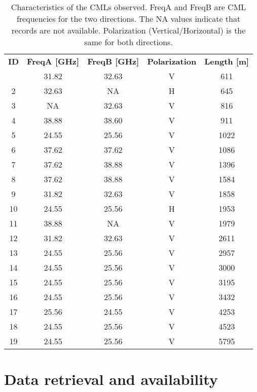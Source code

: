 \documentclass{ctuthesis}\usepackage[]{graphicx}\usepackage[]{color}
\begin{document}
\begin{table}[p]
\small
\begin{ctucolortab}
\centering
\begin{tabular}{ c | c  c  c  c }
\bfseries ID    &       \textbf{FreqA [GHz]}   &  \bfseries FreqB [GHz]  &  \bfseries  Polarization  & \bfseries Length [m]   \\ \Midrule
        1  &	31.82 &	32.63 &	V  &	611     \\
        2  &	32.63 &	NA    &	H  &	645     \\
        3  &	NA    &	32.63 &	V  &	816     \\      
        4  &	38.88 &	38.60 &	V  &	911     \\
        5  &	24.55 &	25.56 &	V  &	1022    \\
        6  &	37.62 &	37.62 &	V  &	1086    \\         
        7  &	37.62 &	38.88 &	V  &	1396    \\
        8  &	37.62 &	38.88 &	V  &	1584    \\
        9  &	31.82 &	32.63 &	V  &	1858    \\
        10  &	24.55 &	25.56 &	H  &	1953    \\
        11  &	38.88 &	NA    &	V  &	1979    \\
        12  &	31.82 &	32.63 &	V  &	2611    \\
        13  &	24.55 &	25.56 &	V  &	2957    \\
        14  &	24.55 &	25.56 &	V  &	3000    \\
        15  &	24.55 &	25.56 &	V  &	3195    \\
        16  &	24.55 &	25.56 &	V  &	3432    \\
        17  &	25.56 &	24.55 &	V  &	4253    \\
        18  &	24.55 &	25.56 &	V  &	4523    \\
        19  &	24.55 &	25.56 &	V  &	5795
\end{tabular}
\caption{Characteristics of the CMLs observed. FreqA and FreqB are CML frequencies for the two directions. The NA values indicate that records are not available. Polarization (Vertical/Horizontal) is the same for both directions.}
\label{3tab1}
\end{ctucolortab}
\end{table}
 
 
\section{Data retrieval and availability} \label{DatRet}
\end{document}

